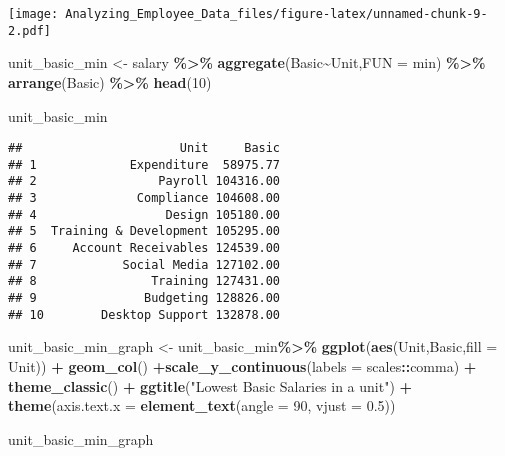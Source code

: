 \documentclass[
]{article}
\newenvironment{Shaded}{\begin{snugshade}}{\end{snugshade}}
\newcommand{\AttributeTok}[1]{\textcolor[rgb]{0.13,0.29,0.53}{#1}}
\newcommand{\DecValTok}[1]{\textcolor[rgb]{0.00,0.00,0.81}{#1}}
\newcommand{\FloatTok}[1]{\textcolor[rgb]{0.00,0.00,0.81}{#1}}
\newcommand{\FunctionTok}[1]{\textcolor[rgb]{0.13,0.29,0.53}{\textbf{#1}}}
\newcommand{\NormalTok}[1]{#1}
\newcommand{\OtherTok}[1]{\textcolor[rgb]{0.56,0.35,0.01}{#1}}
\newcommand{\SpecialCharTok}[1]{\textcolor[rgb]{0.81,0.36,0.00}{\textbf{#1}}}
\newcommand{\StringTok}[1]{\textcolor[rgb]{0.31,0.60,0.02}{#1}}
\begin{document}
\texttt{[image: Analyzing\_Employee\_Data\_files/figure-latex/unnamed-chunk-9-2.pdf]}

\begin{Shaded}
\begin{Highlighting}[]
\NormalTok{unit\_basic\_min  }\OtherTok{\textless{}{-}}\NormalTok{ salary }\SpecialCharTok{\%\textgreater{}\%}
  \FunctionTok{aggregate}\NormalTok{(Basic}\SpecialCharTok{\textasciitilde{}}\NormalTok{Unit,}\AttributeTok{FUN =}\NormalTok{ min) }\SpecialCharTok{\%\textgreater{}\%} 
  \FunctionTok{arrange}\NormalTok{(Basic) }\SpecialCharTok{\%\textgreater{}\%} \FunctionTok{head}\NormalTok{(}\DecValTok{10}\NormalTok{)}
 

\NormalTok{unit\_basic\_min}
\end{Highlighting}
\end{Shaded}

\begin{verbatim}
##                      Unit     Basic
## 1             Expenditure  58975.77
## 2                 Payroll 104316.00
## 3              Compliance 104608.00
## 4                  Design 105180.00
## 5  Training & Development 105295.00
## 6     Account Receivables 124539.00
## 7            Social Media 127102.00
## 8                Training 127431.00
## 9               Budgeting 128826.00
## 10        Desktop Support 132878.00
\end{verbatim}

\begin{Shaded}
\begin{Highlighting}[]
\NormalTok{ unit\_basic\_min\_graph }\OtherTok{\textless{}{-}}\NormalTok{ unit\_basic\_min}\SpecialCharTok{\%\textgreater{}\%}
   \FunctionTok{ggplot}\NormalTok{(}\FunctionTok{aes}\NormalTok{(Unit,Basic,}\AttributeTok{fill =}\NormalTok{ Unit)) }\SpecialCharTok{+} 
   \FunctionTok{geom\_col}\NormalTok{() }\SpecialCharTok{+}\FunctionTok{scale\_y\_continuous}\NormalTok{(}\AttributeTok{labels =}\NormalTok{ scales}\SpecialCharTok{::}\NormalTok{comma)  }\SpecialCharTok{+} 
   \FunctionTok{theme\_classic}\NormalTok{() }\SpecialCharTok{+} 
   \FunctionTok{ggtitle}\NormalTok{(}\StringTok{"Lowest Basic Salaries in a unit"}\NormalTok{) }\SpecialCharTok{+} 
   \FunctionTok{theme}\NormalTok{(}\AttributeTok{axis.text.x =} \FunctionTok{element\_text}\NormalTok{(}\AttributeTok{angle =} \DecValTok{90}\NormalTok{, }\AttributeTok{vjust =} \FloatTok{0.5}\NormalTok{))}


\NormalTok{ unit\_basic\_min\_graph}
\end{Highlighting}
\end{Shaded}
\end{document}

